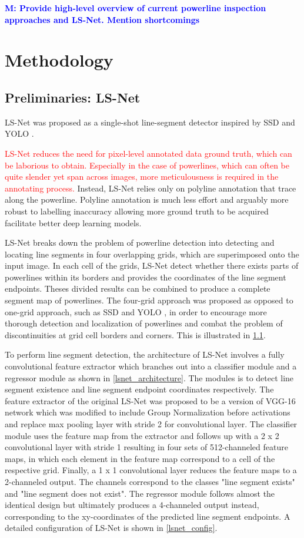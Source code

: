\documentclass[journal]{IEEEtran}
\newcommand{\commentM}[1]{\textbf{\textcolor{blue}{M: #1}}}
\begin{document}
\commentM{Provide high-level overview of current powerline inspection approaches and LS-Net. Mention shortcomings}

\section{Methodology}

\subsection{Preliminaries: LS-Net}
LS-Net \cite{Nguyen2020} was proposed as a single-shot line-segment detector inspired by SSD \cite{SSD} and YOLO \cite{YOLO}. 

\textcolor{red}{LS-Net reduces the need for pixel-level annotated data ground truth, which can be laborious to obtain. Especially in the case of powerlines, which can often be quite slender yet span across images, more meticulousness is required in the annotating process.} Instead, LS-Net relies only on polyline annotation that trace along the powerline. Polyline annotation is much less effort and arguably more robust to labelling inaccuracy allowing more ground truth to be acquired facilitate better deep learning models. 

LS-Net breaks down the problem of powerline detection into detecting and locating line segments in four overlapping grids, which are superimposed onto the input image. In each cell of the grids,  LS-Net detect whether there exists parts of powerlines within its borders and provides the coordinates of the line segment endpoints. Theses divided results can be combined to produce a complete segment map of powerlines. The four-grid approach was proposed as opposed to one-grid approach, such as SSD \cite{SSD} and YOLO \cite{YOLO}, in order to encourage more thorough detection and localization of powerlines and combat the problem of discontinuities at grid cell borders and corners. This is illustrated in \ref{}. 

To perform line segment detection, the architecture of LS-Net involves a fully convolutional feature extractor which branches out into a classifier module and a regressor module as shown in \ref{lsnet_architecture}. The modules is to detect line segment existence and line segment endpoint coordinates respectively. The feature extractor of the original LS-Net was proposed to be a version of VGG-16 network \cite{VGG16} which was modified to include Group Normalization \cite{group_norm} before activations and replace max pooling layer with stride 2 for convolutional layer. The classifier module uses the feature map from the extractor and follows up with a 2 x 2 convolutional layer with stride 1 resulting in four sets of 512-channeled feature maps, in which each element in the feature map correspond to a cell of the respective grid. Finally, a 1 x 1 convolutional layer reduces the feature maps to a 2-channeled output. The channels correspond to the classes "line segment exists" and "line segment does not exist". The regressor module follows almost the identical design but ultimately produces a 4-channeled output instead, corresponding to the xy-coordinates of the predicted line segment endpoints. A detailed configuration of LS-Net is shown in \ref{lsnet_config}.
\end{document}
